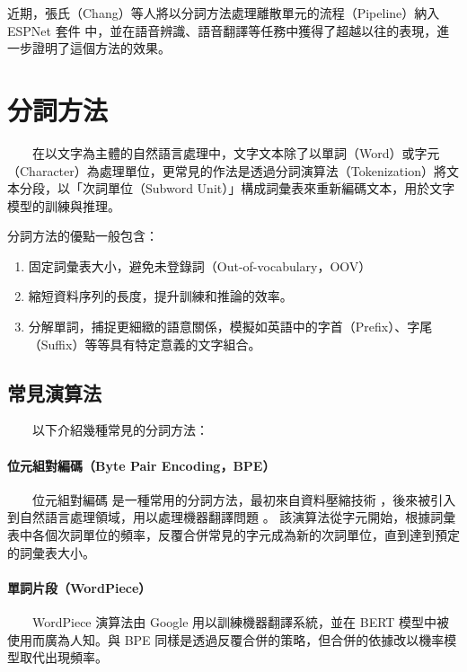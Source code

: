         近期，張氏（Chang）等人\cite{chang_exploring_2024}將以分詞方法處理離散單元的流程（Pipeline）納入 ESPNet 套件 \cite{watanabe2018espnet} 中，並在語音辨識、語音翻譯等任務中獲得了超越以往的表現，進一步證明了這個方法的效果。

\section{分詞方法}

　　在以文字為主體的自然語言處理中，文字文本除了以單詞（Word）或字元（Character）為處理單位，更常見的作法是透過分詞演算法（Tokenization）將文本分段，以「次詞單位（Subword Unit）」構成詞彙表來重新編碼文本，用於文字模型的訓練與推理。

        分詞方法的優點一般包含：

\begin{enumerate}
    \item 固定詞彙表大小，避免未登錄詞（Out-of-vocabulary，OOV）
    \item 縮短資料序列的長度，提升訓練和推論的效率。
    \item 分解單詞，捕捉更細緻的語意關係，模擬如英語中的字首（Prefix）、字尾（Suffix）等等具有特定意義的文字組合。
\end{enumerate}

\subsection{常見演算法}

　　以下介紹幾種常見的分詞方法：

\paragraph{位元組對編碼（Byte Pair Encoding，BPE）}
\hfill \break
　　位元組對編碼 \cite{10.5555/177910.177914, sennrich_neural_2016} 是一種常用的分詞方法，最初來自資料壓縮技術 \cite{10.5555/177910.177914}，後來被引入到自然語言處理領域，用以處理機器翻譯問題 \cite{sennrich_neural_2016} 。
該演算法從字元開始，根據詞彙表中各個次詞單位的頻率，反覆合併常見的字元成為新的次詞單位，直到達到預定的詞彙表大小。

\paragraph{單詞片段（WordPiece）}
\hfill \break
　　WordPiece \cite{wu2016google} 演算法由 Google 用以訓練機器翻譯系統，並在 BERT \cite{devlin_bert_2019} 模型中被使用而廣為人知。與 BPE 同樣是透過反覆合併的策略，但合併的依據改以機率模型取代出現頻率。

